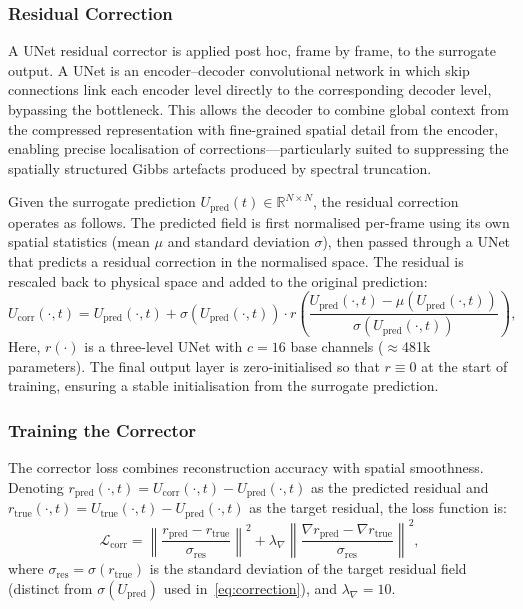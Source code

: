 \documentclass[a4paper]{article}
\newcommand{\R}{\mathbb{R}}
\begin{document}
\subsubsection{Residual Correction}

A UNet \cite{ronneberger2015unet} residual corrector is applied post hoc, frame by frame, to the surrogate output. A UNet is an encoder--decoder convolutional network in which skip connections link each encoder level directly to the corresponding decoder level, bypassing the bottleneck. This allows the decoder to combine global context from the compressed representation with fine-grained spatial detail from the encoder, enabling precise localisation of corrections—particularly suited to suppressing the spatially structured Gibbs artefacts produced by spectral truncation.

Given the surrogate prediction $U_{\mathrm{pred}}(t) \in \R^{N \times N}$, the residual correction operates as follows. The predicted field is first normalised per-frame using its own spatial statistics (mean $\mu$ and standard deviation $\sigma$), then passed through a UNet that predicts a residual correction in the normalised space. The residual is rescaled back to physical space and added to the original prediction:
\begin{equation}
    U_{\mathrm{corr}}(\cdot,t) = U_{\mathrm{pred}}(\cdot,t) + \sigma(U_{\mathrm{pred}}(\cdot,t)) \cdot r\!\left(\frac{U_{\mathrm{pred}}(\cdot,t) - \mu(U_{\mathrm{pred}}(\cdot,t))}{\sigma(U_{\mathrm{pred}}(\cdot,t))}\right),
    \label{eq:correction}
\end{equation}
Here, $r(\cdot)$ is a three-level UNet with $c = 16$ base channels ($\approx$481k parameters). The final output layer is zero-initialised so that $r \equiv 0$ at the start of training, ensuring a stable initialisation from the surrogate prediction.

\subsubsection{Training the Corrector}

The corrector loss combines reconstruction accuracy with spatial smoothness. Denoting $r_{\mathrm{pred}}(\cdot,t) = U_{\mathrm{corr}}(\cdot,t) - U_{\mathrm{pred}}(\cdot,t)$ as the predicted residual and $r_{\mathrm{true}}(\cdot,t) = U_{\mathrm{true}}(\cdot,t) - U_{\mathrm{pred}}(\cdot,t)$ as the target residual, the loss function is:
\begin{equation}
    \mathcal{L}_{\mathrm{corr}} = \left\|\frac{r_{\mathrm{pred}} - r_{\mathrm{true}}}{\sigma_{\mathrm{res}}}\right\|^2 + \lambda_{\nabla}\left\|\frac{\nabla r_{\mathrm{pred}} - \nabla r_{\mathrm{true}}}{\sigma_{\mathrm{res}}}\right\|^2,
    \label{eq:corrloss}
\end{equation}
where $\sigma_{\mathrm{res}} = \sigma(r_{\mathrm{true}})$ is the standard deviation of the target residual field (distinct from $\sigma(U_{\mathrm{pred}})$ used in~\eqref{eq:correction}), and $\lambda_{\nabla} = 10$.
\end{document}
